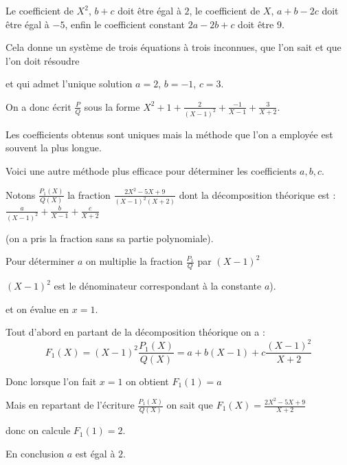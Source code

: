 \change

Le coefficient de $X^2$, $b+c$ doit être égal à $2$,
le coefficient de $X$, $a+b-2c$ doit être égal à $-5$,
enfin le coefficient constant $2a-2b+c$ doit être $9$.

\change

Cela donne un système de trois équations à trois inconnues, 
que l'on sait et que l'on doit résoudre 

\change

et qui admet l'unique solution
$a=2$, $b=-1$, $c=3$.

\change

On a donc écrit $\frac{P}{Q}$ sous la forme 
$X^2+1 + \frac{2}{(X-1)^2} + \frac{-1}{X-1} + \frac{3}{X+2}.$

Les coefficients obtenus sont uniques mais la méthode que l'on a employée est souvent la plus longue.


\diapo

Voici une autre méthode plus efficace pour déterminer les coefficients $a,b,c$.


Notons $\frac{P_1(X)}{Q(X)}$ la fraction $\frac{2X^2-5X+9}{(X-1)^2(X+2)}$ dont la décomposition théorique est :
$\frac{a}{(X-1)^2} + \frac{b}{X-1} + \frac{c}{X+2}$

(on a pris la fraction sans sa partie polynomiale).


\change

Pour déterminer $a$ on multiplie la fraction $\frac{P_1}{Q}$ par $(X-1)^2$ 

$(X-1)^2$ est le dénominateur correspondant à la constante $a$).

et on évalue en $x=1$.

\change

Tout d'abord en partant de la décomposition théorique on a :
$$F_1(X)= (X-1)^2 \frac{P_1(X)}{Q(X)} = a + b(X-1) + c\frac{(X-1)^2}{X+2}$$

\change

Donc lorsque l'on fait $x=1$ on obtient $F_1(1)=a$

\change

Mais en repartant de l'écriture $\frac{P_1(X)}{Q(X)}$ on sait que $F_1(X) = \frac{2X^2-5X+9}{X+2}$

\change

donc on calcule $F_1(1)=2$.

\change

En conclusion $a$ est égal à $2$.

\change

